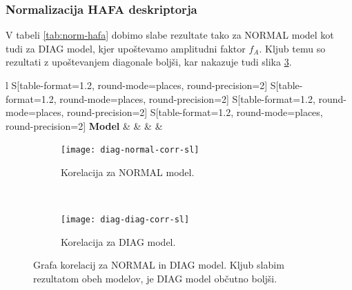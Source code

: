 \subsubsection{Normalizacija HAFA deskriptorja}
V tabeli \ref{tab:norm-hafa} dobimo slabe rezultate tako za NORMAL model kot tudi za DIAG model, kjer upoštevamo amplitudni faktor $f_A$. Kljub temu so rezultati z upoštevanjem diagonale boljši, kar nakazuje tudi slika \ref{fig:corr-diag}.

\begin{table}[!htbp]
	\centering
	\begin{tabular}{l S[table-format=1.2, round-mode=places, round-precision=2] S[table-format=1.2, round-mode=places, round-precision=2] S[table-format=1.2, round-mode=places, round-precision=2] S[table-format=1.2, round-mode=places, round-precision=2]}
		\toprule
		\textbf{Model} &  &  &  &  \\
		\midrule
		\bottomrule
	\end{tabular}
	\caption{Evaluacijske metrike pri primerjavi modelov NORMAL in DIAG, kjer upoštevamo amplitudni faktor $f_A$. }
	\label{tab:norm-hafa}
\end{table}

\begin{figure}[!htb]
	\centering
	\begin{subfigure}[t]{0.45\columnwidth}
		\texttt{[image: diag-normal-corr-sl]}
		\caption{Korelacija za NORMAL model.}
		\label{fig:corr-diag-normal}
	\end{subfigure}
	~
	\begin{subfigure}[t]{0.45\columnwidth}
		\texttt{[image: diag-diag-corr-sl]}
		\caption{Korelacija za DIAG model.}
		\label{fig:corr-diag-diag}
	\end{subfigure}
	\caption[]{Grafa korelacij za NORMAL in DIAG model. Kljub slabim rezultatom obeh modelov, je DIAG model občutno boljši.}
	\label{fig:corr-diag}
\end{figure}


